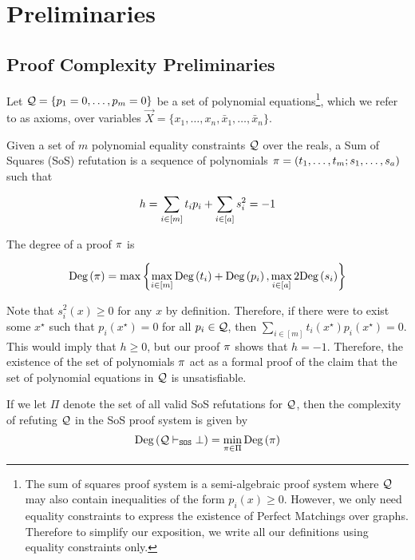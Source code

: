 \documentclass[11pt]{article}
\begin{document}
\section{Preliminaries}
\label{sec:prelims}


\subsection{Proof Complexity Preliminaries}
\label{sec:proof-system-prelims}

Let $\mathcal{Q} = \{ p_1 = 0, \dots, p_m = 0\}$ be a set of polynomial equations\footnote{The sum of squares proof system is a semi-algebraic proof system where $\mathcal{Q}$ may also contain inequalities of the form $p_i(x) \ge 0$. 
However, we only need equality constraints to express the existence of Perfect Matchings over graphs. 
Therefore to simplify our exposition, we write all our definitions using equality constraints only.}, which we refer to as axioms, over variables $\vec{X} = \{x_1, \dots, x_n, \bar{x}_1, \dots, \bar{x}_n\}$.

\begin{definition}\label{def:sum-of-squares} 
Given a set of $m$ polynomial equality constraints $\mathcal{Q}$ over the reals, a Sum of Squares (SoS) refutation is a sequence of polynomials $\pi = (t_1, \dots, t_m; s_1, \dots, s_a)$ such that

\[ h = \sum_{i \in [m]} t_ip_i+ \sum_{i \in [a]} s_i^2 = -1\]

The degree of a proof $\pi$ is

\[ \text{Deg}\left(\pi\right) = \max\left\{\max_{i \in [m]} \text{Deg}\left(t_i\right) + \text{Deg}\left(p_i\right), \max_{i \in [a]} 2\text{Deg}\left(s_i\right)\right\}\]

\end{definition}

Note that $s_i^2(x) \ge 0$ for any $x$ by definition. 
Therefore, if there were to exist some $x^{\star}$ such that $p_i(x^{\star}) = 0$ for all $p_i \in \mathcal{Q}$, then $\sum_{i \in [m]} t_i(x^\star)p_i(x^\star) = 0$. 
This would imply that $h \ge 0$, but our proof $\pi$ shows that $h = -1$. 
Therefore, the existence of the set of polynomials $\pi$ act as a formal proof of the claim that the set of polynomial equations in $\mathcal{Q}$ is unsatisfiable.
\begin{definition}
If we let $\Pi$ denote the set of all valid SoS refutations for $\mathcal{Q}$, then the complexity of refuting $\mathcal{Q}$ in the SoS proof system is given by 
\[ \text{Deg}\left(\mathcal{Q} \vdash_{\texttt{SOS}} \bot\right) = \min_{\pi \in \Pi}\text{Deg}\left(\pi\right)\]

\end{definition}
\end{document}
